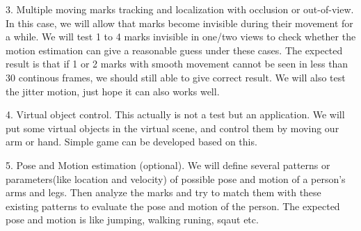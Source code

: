 \documentclass[10pt,twocolumn,letterpaper]{article}
\begin{document}
3. Multiple moving marks tracking and localization with occlusion or out-of-view. In this case, we will allow that marks become invisible during their movement for a while. We will test 1 to 4 marks invisible in one/two views to check whether the motion estimation can give a reasonable guess under these cases. The expected result is that if 1 or 2 marks with smooth movement cannot be seen in less than 30 continous frames, we should still able to give correct result. We will also test the jitter motion, just hope it can also works well.


4. Virtual object control. This actually is not a test but an application. We will put some virtual objects in the virtual scene, and control them by moving our arm or hand. Simple game can be developed based on this. 


5. Pose and Motion estimation (optional). We will define several patterns or parameters(like location and velocity) of possible pose and motion of a person's arms and legs. Then analyze the marks and try to match them with these existing patterns to evaluate the pose and motion of the person. The expected pose and motion is like jumping, walking runing, sqaut etc.


{\small


}

\end{document}
